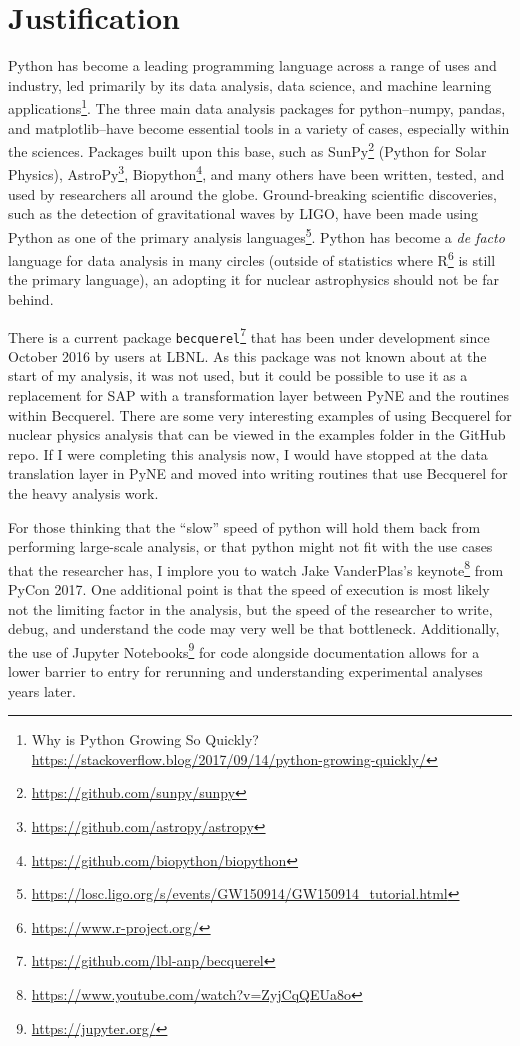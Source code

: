 \section{Justification}

Python has become a leading programming language across a range of uses
and industry, led primarily by its data analysis, data science, and
machine learning applications\footnote{Why is Python Growing So Quickly?
\url{https://stackoverflow.blog/2017/09/14/python-growing-quickly/}}.
The three main data analysis packages for python\---{}numpy, pandas, and
matplotlib\---{}have become essential tools in a variety of cases,
especially within the sciences. Packages built upon this base, such as
SunPy\footnote{\url{https://github.com/sunpy/sunpy}} (Python for Solar
Physics), AstroPy\footnote{\url{https://github.com/astropy/astropy}},
Biopython\footnote{\url{https://github.com/biopython/biopython}}, and
many others have been written, tested, and used by researchers all
around the globe. Ground-breaking scientific discoveries, such as the
detection of gravitational waves by LIGO, have been made using Python
as one of the primary analysis
languages\footnote{\url{https://losc.ligo.org/s/events/GW150914/GW150914_tutorial.html}}.
Python has become a \emph{de facto} language for data analysis in many
circles (outside of statistics where
R\footnote{\url{https://www.r-project.org/}} is still the primary
language), an adopting it for nuclear astrophysics should not be far
behind.

There is a current package
\verb+becquerel+\footnote{\url{https://github.com/lbl-anp/becquerel}}
that has been under development since October 2016 by users at LBNL. As
this package was not known about at the start of my analysis, it was not
used, but it could be possible to use it as a replacement for SAP with
a transformation layer between PyNE and the routines within Becquerel.
There are some very interesting examples of using Becquerel for nuclear
physics analysis that can be viewed in the examples folder in the GitHub
repo. If I were completing this analysis now, I would have stopped at
the data translation layer in PyNE and moved into writing routines that
use Becquerel for the heavy analysis work.

For those thinking that the ``slow'' speed of python will hold them back
from performing large-scale analysis, or that python might not fit with
the use cases that the researcher has, I implore you to watch Jake
VanderPlas's
keynote\footnote{\url{https://www.youtube.com/watch?v=ZyjCqQEUa8o}} from
PyCon 2017. One additional point is that the speed of execution is most
likely not the limiting factor in the analysis, but the speed of the
researcher to write, debug, and understand the code may very well be
that bottleneck. Additionally, the use of Jupyter
Notebooks\footnote{\url{https://jupyter.org/}} for code alongside
documentation allows for a lower barrier to entry for rerunning and
understanding experimental analyses years later.


